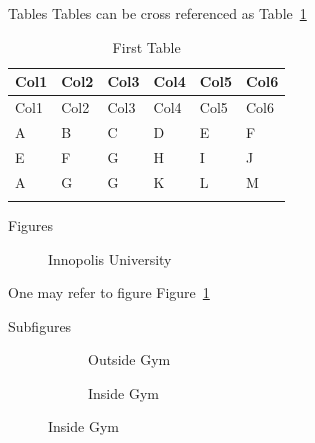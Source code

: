 \documentclass[
  ignorenonframetext,
  aspectratio=169,
]{beamer}
\theoremstyle{plain}
\theoremstyle{remark}
\begin{document}
\begin{frame}{Tables}
Tables can be cross referenced as Table~\ref{tbl-first}

\begin{longtable}[]{@{}llllll@{}}
\toprule\noalign{}
Col1 & Col2 & Col3 & Col4 & Col5 & Col6 \\
\midrule\noalign{}
\endfirsthead
\toprule\noalign{}
Col1 & Col2 & Col3 & Col4 & Col5 & Col6 \\
\midrule\noalign{}
\endhead
A & B & C & D & E & F \\
E & F & G & H & I & J \\
A & G & G & K & L & M \\
\bottomrule\noalign{}
\caption{First Table}\label{tbl-first}\tabularnewline
\end{longtable}
\end{frame}

\begin{frame}{Figures}
\label{figures}
\begin{figure}


\caption{\label{fig-inno}Innopolis University}

\end{figure}%

One may refer to figure Figure~\ref{fig-inno}
\end{frame}

\begin{frame}{Subfigures}
\label{subfigures}
\begin{figure}

\begin{minipage}{0.50\linewidth}

\begin{figure}[H]


\caption{\label{fig-inno_gym}Outside Gym}

\end{figure}%

\end{minipage}%
%
\begin{minipage}{0.50\linewidth}

\begin{figure}[H]


\caption{\label{fig-inno_pool}Inside Gym}

\end{figure}%

\end{minipage}%

\end{figure}%
\end{frame}
\end{document}

